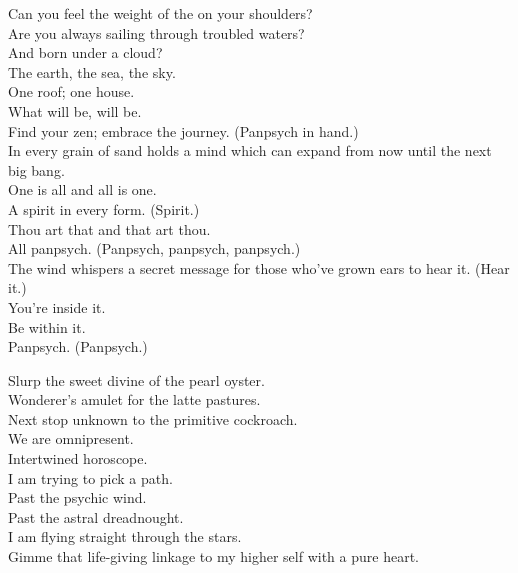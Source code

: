 



Can you feel the weight of the  on your shoulders? \\
Are you always sailing through troubled waters? \\
And born under a cloud? \\
The earth, the sea, the sky. \\
One roof; one house. \\

What will be, will be. \\
Find your zen; embrace the journey. (Panpsych in hand.) \\
In every grain of sand holds a mind which can expand from now until the next big bang. \\

One is all and all is one. \\
A spirit in every form. (Spirit.) \\
Thou art that and that art thou. \\
All panpsych. (Panpsych, panpsych, panpsych.) \\
The wind whispers a secret message for those who've grown ears to hear it. (Hear it.) \\
You're inside it. \\
Be within it. \\
Panpsych. (Panpsych.) \\


Slurp the sweet divine of the pearl oyster. \\
Wonderer's amulet for the latte pastures. \\
Next stop unknown to the primitive cockroach. \\
We are omnipresent. \\
Intertwined horoscope. \\

I am trying to pick a path. \\
Past the psychic wind. \\
Past the astral dreadnought. \\
I am flying straight through the stars. \\
Gimme that life-giving linkage to my higher self with a pure heart. \\

